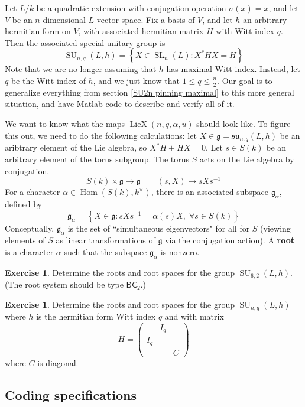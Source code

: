 \documentclass[12pt]{article}
\theoremstyle{definition}
\newtheorem{exercise}[theorem]{Exercise}
\numberwithin{theorem}{subsection}
\newcommand{\sig}{\sigma}
\newcommand{\lb}{\left\{}
\newcommand{\rb}{\right\}}
\newcommand{\tbf}{\textbf}
\newcommand{\inv}{^{-1}}
\newcommand{\ov}{\overline}
\newcommand{\frakg}{\mathfrak{g}}
\newcommand{\fraksu}{\mathfrak{su}}
\DeclareMathOperator{\Hom}{Hom}
\DeclareMathOperator{\SL}{SL}
\DeclareMathOperator{\SU}{SU}
\DeclareMathOperator{\LieX}{LieX}
\begin{document}
Let $L/k$ be a quadratic extension with conjugation operation $\sig(x) = \ov x$, and let $V$ be an $n$-dimensional $L$-vector space. Fix a basis of $V$, and let $h$ an arbitrary hermitian form on $V$, with associated hermitian matrix $H$ with Witt index $q$. Then the associated special unitary group is
\[
	\SU_{n,q}(L,h) = \lb X \in \SL_{n}(L) : X^*HX = H \rb
\]
Note that we are no longer assuming that $h$ has maximal Witt index. Instead, let $q$ be the Witt index of $h$, and we just know that $1 \le q \le \frac{n}{2}$. Our goal is to generalize everything from section \ref{SU2n pinning maximal} to this more general situation, and have Matlab code to describe and verify all of it.

We want to know what the maps $\LieX(n,q,\alpha,u)$ should look like. To figure this out, we need to do the following calculations: let $X \in \frakg =  \fraksu_{n,q}(L,h)$ be an aribtrary element of the Lie algebra, so $X^*H + HX = 0$. Let $s \in S(k)$ be an arbitrary element of the torus subgroup. The torus $S$ acts on the Lie algebra by conjugation.
\[
	S(k) \times \frakg \to \frakg \qquad (s,X) \mapsto sXs \inv
\]
For a character $\alpha \in \Hom(S(k), k^\times)$, there is an associated subspace $\frakg_\alpha$, defined by
\[
	\frakg_\alpha = \lb X \in \frakg : sXs \inv = \alpha(s) X, \; \forall s \in S(k) \rb
\]
Conceptually, $\frakg_\alpha$ is the set of ``simultaneous eigenvectors" for all for $S$ (viewing elements of $S$ as linear transformations of $\frakg$ via the conjugation action). A \tbf{root} is a character $\alpha$ such that the subspace $\frakg_\alpha$ is nonzero. 

\begin{exercise}
Determine the roots and root spaces for the group $\SU_{6,2}(L,h)$. (The root system should be type $\mathsf{BC}_2$.)
\end{exercise}

\begin{exercise}
Determine the roots and root spaces for the group $\SU_{n,q}(L,h)$ where $h$ is the hermitian form Witt index $q$ and with matrix
\[
	H =
	\begin{pmatrix}
		& I_q\\
		I_q \\
		&& C
	\end{pmatrix}
\]
where $C$ is diagonal.
\end{exercise}

\subsection{Coding specifications}
\end{document}
